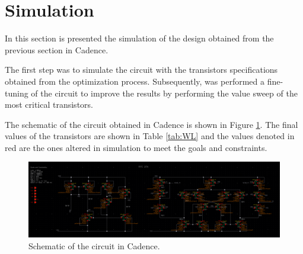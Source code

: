 \section{Simulation}

In this section is presented the simulation of the design obtained from the previous section in Cadence.

The first step was to simulate the circuit with the transistors specifications obtained from the optimization process. Subsequently, was performed a fine-tuning of the circuit to improve the results by performing the value sweep of the most critical transistors.

The schematic of the circuit obtained in Cadence is shown in Figure \ref{fig:WL}. The final values of the transistors are shown in Table \ref{tab:WL} and the values denoted in red are the ones altered in simulation to meet the goals and constraints.

\begin{figure}[H]
    \centering
    \includegraphics[width=1\textwidth]{Images/wLcircuit.png}
    \caption{Schematic of the circuit in Cadence.}
    \label{fig:WL}
\end{figure}

